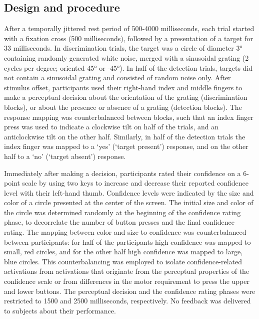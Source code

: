 \documentclass[12pt,twoside]{reedthesis}
\begin{document}
\hypertarget{design-and-procedure}{%
\subsection{Design and procedure}\label{design-and-procedure}}

After a temporally jittered rest period of 500-4000 milliseconds, each trial started with a fixation cross (500 milliseconds), followed by a presentation of a target for 33 milliseconds. In discrimination trials, the target was a circle of diameter 3° containing randomly generated white noise, merged with a sinusoidal grating (2 cycles per degree; oriented 45° or -45°). In half of the detection trials, targets did not contain a sinusoidal grating and consisted of random noise only. After stimulus offset, participants used their right-hand index and middle fingers to make a perceptual decision about the orientation of the grating (discrimination blocks), or about the presence or absence of a grating (detection blocks). The response mapping was counterbalanced between blocks, such that an index finger press was used to indicate a clockwise tilt on half of the trials, and an anticlockwise tilt on the other half. Similarly, in half of the detection trials the index finger was mapped to a `yes' (`target present') response, and on the other half to a `no' (`target absent') response.

Immediately after making a decision, participants rated their confidence on a 6-point scale by using two keys to increase and decrease their reported confidence level with their left-hand thumb. Confidence levels were indicated by the size and color of a circle presented at the center of the screen. The initial size and color of the circle was determined randomly at the beginning of the confidence rating phase, to decorrelate the number of button presses and the final confidence rating. The mapping between color and size to confidence was counterbalanced between participants: for half of the participants high confidence was mapped to small, red circles, and for the other half high confidence was mapped to large, blue circles. This counterbalancing was employed to isolate confidence-related activations from activations that originate from the perceptual properties of the confidence scale or from differences in the motor requirement to press the upper and lower buttons. The perceptual decision and the confidence rating phases were restricted to 1500 and 2500 milliseconds, respectively. No feedback was delivered to subjects about their performance.
\end{document}
